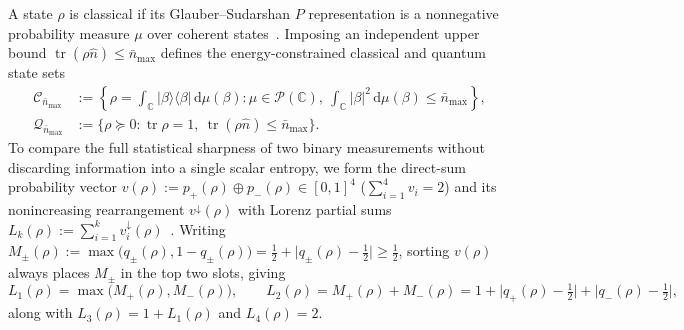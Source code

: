 \documentclass{iopjournal}
\newcommand{\tr}{\operatorname{tr}}
\newcommand{\Cset}{\mathcal{C}}
\newcommand{\Qset}{\mathcal{Q}}
\newcommand{\Pset}{\mathcal{P}}
\newcommand{\nbar}{\bar n_{\max}}
\newcommand{\ket}[1]{\lvert #1\rangle}
\newcommand{\bra}[1]{\langle #1\rvert}
\newcommand{\abs}[1]{\lvert #1\rvert}
\newcommand{\dd}{\mathrm{d}}
\begin{document}
A state $\rho$ is classical if its Glauber--Sudarshan $P$ representation is a nonnegative probability measure $\mu$ over coherent states~\cite{Glauber1963,Sudarshan1963,GerryKnight2005}. Imposing an independent upper bound $\tr(\rho\hat n) \le \nbar$ defines the energy-constrained classical and quantum state sets
\begin{align}\label{eq:state-sets}
\Cset_{\nbar} &:= \left\{\rho = \int_{\mathbb{C}} \ket{\beta}\!\bra{\beta}\,\dd\mu(\beta) : \mu \in \Pset(\mathbb{C}),\ \int_{\mathbb{C}} \abs{\beta}^2\,\dd\mu(\beta) \le \nbar \right\}, \\
\Qset_{\nbar} &:= \bigl\{\rho \succeq 0 : \tr\rho = 1,\ \tr(\rho\hat n) \le \nbar\bigr\}. \nonumber
\end{align}
To compare the full statistical sharpness of two binary measurements without discarding information into a single scalar entropy, we form the direct-sum probability vector $v(\rho) := p_+(\rho) \oplus p_-(\rho) \in [0,1]^4$ ($\sum_{i=1}^4 v_i = 2$) and its nonincreasing rearrangement $v^\downarrow(\rho)$ with Lorenz partial sums $L_k(\rho) := \sum_{i=1}^k v_i^\downarrow(\rho)$~\cite{MarshallOlkin2011,Friedland2013,Rudnicki2014,ZhuManuscript}. Writing $M_\pm(\rho) := \max\bigl(q_\pm(\rho), 1-q_\pm(\rho)\bigr) = \frac{1}{2} + \abs{q_\pm(\rho) - \frac{1}{2}} \ge \frac{1}{2}$, sorting $v(\rho)$ always places $M_\pm$ in the top two slots, giving
\begin{equation}\label{eq:L2-formula}
L_1(\rho) = \max\bigl(M_+(\rho), M_-(\rho)\bigr), \qquad
L_2(\rho) = M_+(\rho) + M_-(\rho) = 1 + \abs{q_+(\rho) - \tfrac{1}{2}} + \abs{q_-(\rho) - \tfrac{1}{2}},
\end{equation}
along with $L_3(\rho) = 1 + L_1(\rho)$ and $L_4(\rho) = 2$.
\end{document}
